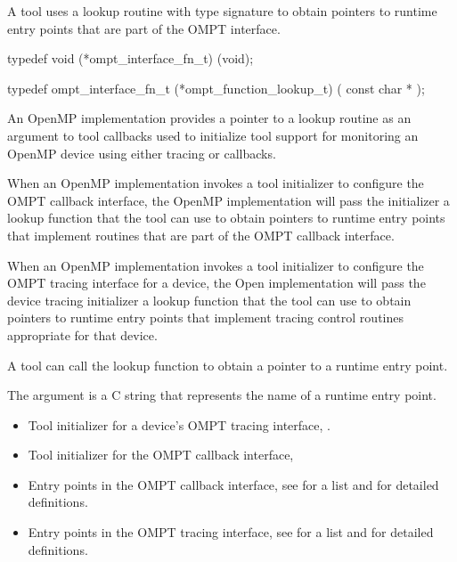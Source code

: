 \label{sec:ompt_function_lookup_t}
\label{sec:ompt_function_lookup}

\summary
A tool uses a lookup routine with type signature
to obtain pointers to runtime entry points that are
part of the OMPT interface.

\format

\begin{ccppspecific}
\begin{omptInquiry}
typedef void (*ompt_interface_fn_t) (void);

typedef ompt_interface_fn_t (*ompt_function_lookup_t) (
  const char *
);
\end{omptInquiry}
\end{ccppspecific}


\descr

An OpenMP implementation provides a pointer to a lookup routine as an
argument to tool callbacks used to initialize tool support for
monitoring an OpenMP device using either tracing or callbacks.



When an OpenMP implementation invokes a tool initializer to configure
the OMPT callback interface, the OpenMP implementation will pass the
initializer a lookup function that the tool can use to obtain
pointers to runtime entry points that implement routines that are part of
the OMPT callback interface.

When an OpenMP implementation invokes a tool initializer to configure
the OMPT tracing interface for a device, the Open implementation will
pass the device tracing initializer a lookup function that the tool
can use to obtain pointers to runtime entry points that implement
tracing control routines appropriate for that device.

A tool can call the lookup function to obtain a pointer to a runtime
entry point.

\argdesc
The argument  is a C string
that represents the name of a runtime entry point.

\crossreferences
\begin{itemize}
\item Tool initializer for a device's OMPT tracing interface, 
.
\item Tool initializer for the OMPT callback interface, 
\item Entry points in the OMPT callback interface, see
   for a list and
   for detailed definitions.
\item Entry points in the OMPT tracing interface, see
   for a list and
   for detailed definitions.
\end{itemize}
